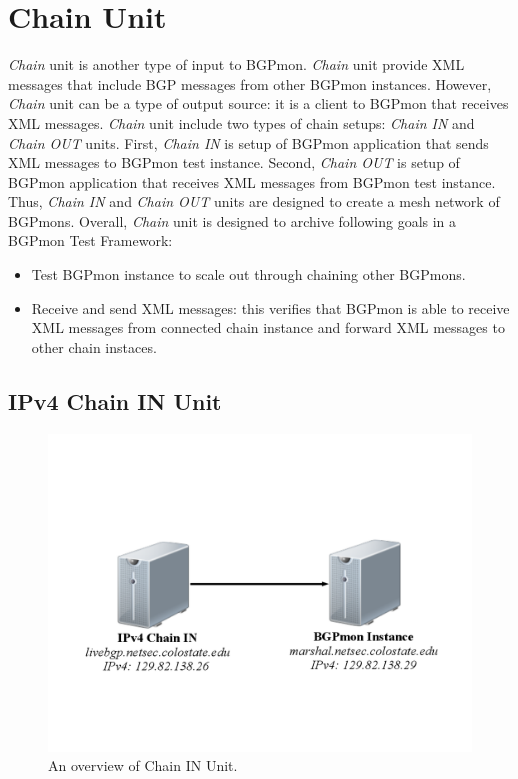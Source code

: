 \section{Chain Unit}
\label{sec:chain}

\emph{Chain} unit is another type of input to BGPmon.  \emph{Chain} unit  provide XML messages that include BGP messages from other BGPmon instances.  However, \emph{Chain} unit can be a type of output source: it is a client to BGPmon that receives XML messages.    \emph{Chain} unit include two types of chain setups: \emph{Chain IN} and \emph{Chain OUT} units. First, \emph{Chain IN} is setup of BGPmon application that sends XML messages to BGPmon test instance. Second, \emph{Chain OUT} is setup of BGPmon application that receives XML messages from BGPmon test instance. Thus, \emph{Chain IN} and \emph{Chain OUT} units are designed to create a mesh network of BGPmons. Overall, \emph{Chain} unit is designed to archive following goals in a BGPmon Test Framework:
\begin{itemize}
\item{Test BGPmon instance to scale out through chaining other BGPmons.}
\item{Receive and send XML messages: this verifies that BGPmon is able to receive XML messages from connected chain instance and forward XML messages to other chain instaces.}
\end{itemize}


\subsection{IPv4 Chain IN Unit}

\begin{figure}
\centering
\includegraphics[scale=0.30]{figs/ipv4-chain-in.png}
\caption{An overview of Chain IN Unit.}
\label{chainin}
\end{figure}

